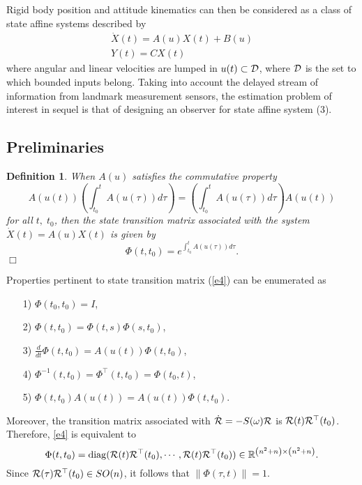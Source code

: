 \documentclass[12pt,draftcls,onecolumn]{IEEEtran}
\newtheorem{df}{Definition}
\newcommand{\carrew} {\hfill $\Box$}
\begin{document}
Rigid body position and attitude kinematics can then be considered as a class of state affine systems described by
\begin{equation} \label{e3}
\begin{array}{l}
\dot X(t) = A(u)X(t) + B(u)\\
Y(t) = CX(t)
\end{array}
\end{equation}
where angular and linear velocities are lumped in $u(t) \subset {\cal D}$, where ${\cal D}$ is the set to which bounded inputs belong.
Taking into account the delayed stream of information from landmark measurement sensors, the estimation problem of interest in sequel is that of designing an observer for state affine system (3).


\subsection{Preliminaries}

\begin{df} \label{def1}  \cite{c17} When $A(u)$  satisfies the commutative property
\begin{equation} \label{eq:comproperty}
A(u(t))\left( {\int_{{t_0}}^t {A(u(\tau ))d\tau } } \right) = \left( {\int_{{t_0}}^t {A(u(\tau ))d\tau } } \right)A(u(t))
\end{equation}
for all $t,\;{t_0}$, then the state transition matrix associated with the system  $\dot X(t) = A(u)X(t)$ is given by
\begin{equation}  \label{e4}
\Phi (t,{t_0}) = {e^{\int_{{t_0}}^t {A(u(\tau ))d\tau } }}.
\end{equation}  \carrew
\end{df}
Properties pertinent to state transition matrix (\ref{e4}) can be enumerated as
\begin{itemize}
\item[1)] $\Phi ({t_0},{t_0}) = I$,
\item[2)] $\Phi (t,{t_0}) = \Phi (t,s)\Phi (s,{t_0})$,
\item[3)] $\frac{d}{{dt}}\Phi (t,{t_0}) = A(u(t))\Phi (t,{t_0})$,
\item[4)] ${\Phi ^{ - 1}}(t,{t_0}) = {\Phi ^\top}(t,{t_0}) = \Phi ({t_0},t)$,
\item[5)] $\Phi (t,{t_0})A(u(t)) = A(u(t))\Phi (t,{t_0})$.
\end{itemize}
Moreover, the transition matrix associated with $\dot {\cal R} =  - S(\omega ){\cal R}$ is ${\cal R}(t){{\cal R}^\top}({t_0})$. Therefore,  \eqref{e4} is equivalent to  
\begin{equation} \label{e5}
\Phi (t,{t_0}) = {\mathop{\rm diag}\nolimits} ({\cal R}(t){{\cal R}^\top}({t_0}), \cdots ,{\cal R}(t){{\cal R}^\top}({t_0}))\in {{\mathbb R}^{\left( {{n^2} + n} \right) \times \left( {{n^2} + n} \right)}}.
\end{equation}
Since ${\cal R}(\tau ){{\cal R}^\top}(t_0) \in SO(n)$, it follows that $\left\| {\Phi (\tau ,t)} \right\| = 1$.
\end{document}
